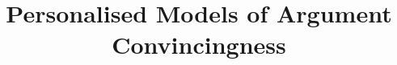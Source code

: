 \documentclass[11pt]{article}
\title{ 
Personalised Models of Argument Convincingness
}
\author{\IEEEauthorblockN{Anonymous}
\IEEEauthorblockA{Anonymous, \\
Anonymous \\
Email: anonymous}
\and
\IEEEauthorblockN{Anonymous}
\IEEEauthorblockA{Anonymous, \\
Anonymous \\
Email: anonymous}
\and
\IEEEauthorblockN{Anonymous}
\IEEEauthorblockA{Anonymous, \\
Anonymous \\
Email: anonymous}
}
\begin{document}
\maketitle

\begin{abstract}
\end{abstract}

%
\IEEEpeerreviewmaketitle









%


\end{document}
